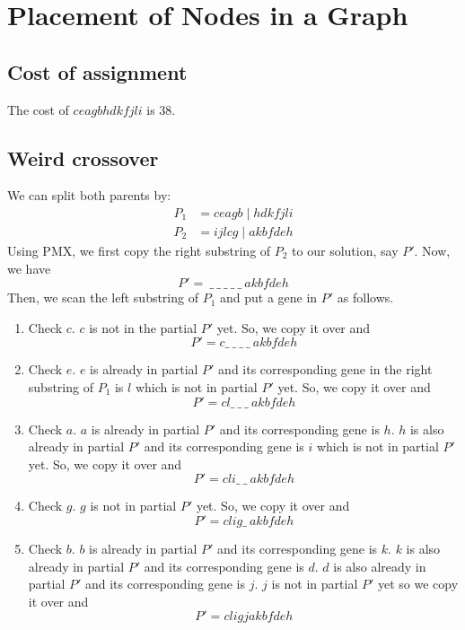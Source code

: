 \section{Placement of Nodes in a Graph}

\subsection{Cost of assignment}

The cost of \(ceagbhdkfjli\) is \(38\).

\subsection{Weird crossover}

We can split both parents by:
\[
\begin{aligned}
    P_1 &= ceagb \mid hdkfjli \\
    P_2 &= ijlcg \mid akbfdeh
\end{aligned}
\]
Using PMX, we first copy the right substring of \(P_2\) to our solution, say \(P'\). Now, we have 
\[
    P' =\ \_\ \_\ \_\ \_\ \_\ akbfdeh
\]
Then, we scan the left substring of \(P_1\) and put a gene in \(P'\) as follows.
\begin{enumerate}
    \item Check \(c\). \(c\) is not in the partial \(P'\) yet. So, we copy it over and
        \[
            P' = c\_\ \_\ \_\ \_\ akbfdeh
        \]
    \item Check \(e\). \(e\) is already in partial \(P'\) and its corresponding gene in the right substring of \(P_1\) is \(l\) which is not in partial \(P'\) yet. So, we copy it over and
        \[
            P' = cl\_\ \_\ \_\ akbfdeh
        \]
    \item Check \(a\). \(a\) is already in partial \(P'\) and its corresponding gene is \(h\). \(h\) is also already in partial \(P'\) and its corresponding gene is \(i\) which is not in partial \(P'\) yet. So, we copy it over and
        \[
            P' = cli\_\ \_\ akbfdeh
        \]
    \item Check \(g\). \(g\) is not in partial \(P'\) yet. So, we copy it over and
        \[
            P' = clig\_\ akbfdeh
        \]
    \item Check \(b\). \(b\) is already in partial \(P'\) and its corresponding gene is \(k\). \(k\) is also already in partial \(P'\) and its corresponding gene is \(d\). \(d\) is also already in partial \(P'\) and its corresponding gene is \(j\). \(j\) is not in partial \(P'\) yet so we copy it over and
        \[
            P' = cligjakbfdeh
        \]
\end{enumerate}

